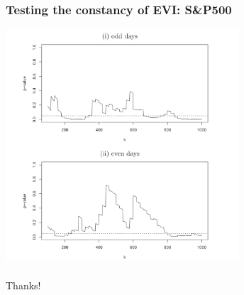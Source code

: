 \documentclass{beamer}
\begin{document}
\begin{frame}
    \frametitle{Testing the constancy of EVI: S\&P500}

    \begin{center}
        \includegraphics[width=0.65\textwidth]{Figure6}
    \end{center}

\end{frame}

\begin{frame}
    \frametitle{}
\begin{center}
    \LARGE Thanks!
\end{center}
    

\end{frame}
\end{document}

